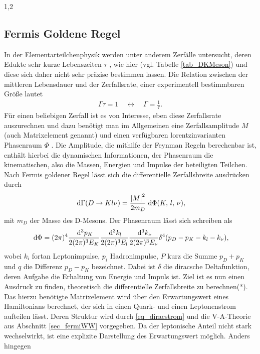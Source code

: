 \documentclass[11pt,a4paper,twoside]{report}
\begin{document}
\begin{spacing}{1,2}
\subsection{Fermis Goldene Regel}
\label{sec_fermigoldenrule}
In der Elementarteilchenphysik werden unter anderem Zerfälle untersucht, deren Edukte sehr kurze Lebenszeiten $\tau$ , wie hier (vgl. Tabelle \ref{tab_DKMeson}) und diese sich daher nicht sehr präzise
bestimmen lassen. Die Relation zwischen der mittleren Lebensdauer und der Zerfallsrate, einer experimentell bestimmbaren Größe lautet
\begin{align}
 \Gamma \tau = 1 \quad \leftrightarrow\quad  \Gamma = \frac{1}{\tau}.
\end{align} 
Für einen beliebigen Zerfall ist es von Interesse, eben diese Zerfallsrate auszurechnen und dazu
benötigt man im Allgemeinen eine Zerfallsamplitude $M$ (auch Matrixelement genannt) und einen verfügbaren lorentzinvarianten Phasenraum $\Phi$ 
\cite{TeilFortgeschr}\cite{Griffiths}. Die Amplitude,
die mithilfe der Feynman Regeln berechenbar ist, enthält hierbei die dynamischen Informationen, der Phasenraum die kinematischen, also die Massen, Energien
und Impulse der beteiligten Teilchen. Nach Fermis goldener Regel lässt sich die differentielle Zerfallsbreite ausdrücken durch
\begin{align}
 \; \mathrm{d} \Gamma(D \rightarrow K l \nu) = \frac{\left|M\right|^2}{2m_D}\; \mathrm{d} \Phi(K, \,l,\, \nu),
 \label{eq_fermirule}
\end{align}
mit $m_D$ der Masse des D-Mesons. Der Phasenraum lässt sich schreiben als
\begin{align}
 \; \mathrm{d} \Phi = (2\pi)^4 \frac{\; \mathrm{d}^3p_K}{2(2\pi)^3E_K}\frac{\; \mathrm{d}^3k_l}{2(2\pi)^3E_l}\frac{\; \mathrm{d}^3k_\nu}{2(2\pi)^3E_\nu}\delta^4(p_D-p_K-k_l-k_\nu),
\end{align}
wobei $k_i$ fortan Leptonimpulse, $p_i$ Hadronimpulse, $P$ kurz die Summe $p_D+p_K$ und $q$ die Differenz $p_D - p_K$ bezeichnet. 
Dabei ist $\delta$ die diracsche Deltafunktion, deren Aufgabe die Erhaltung von Energie und Impuls ist. Ziel ist es nun einen Ausdruck zu finden,
theoretisch die differentielle Zerfallsbreite zu berechnen(*). Das hierzu benötigte Matrixelement wird über den Erwartungswert eines Hamiltonians berechnet,
der sich in einen Quark- und einen Leptonenstrom aufteilen lässt. Deren Struktur wird durch \eqref{eq_diracstrom} und die V-A-Theorie aus Abschnitt 
\ref{sec_fermiWW} vorgegeben. Da der leptonische Anteil nicht stark wechselwirkt, ist eine explizite Darstellung des Erwartungswert möglich. Anders hingegen

\end{spacing}
\end{document}

